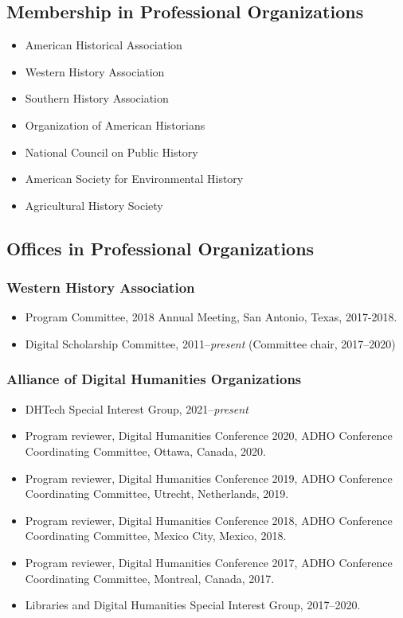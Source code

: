 \documentclass[10pt]{article}
\begin{document}
\subsection*{Membership in Professional Organizations}

\begin{itemize}
  \item American Historical Association
  \item Western History Association
  \item Southern History Association
  \item Organization of American Historians
  \item National Council on Public History
  \item American Society for Environmental History
  \item Agricultural History Society
\end{itemize}

\subsection*{Offices in Professional Organizations}

\subsubsection*{Western History Association}

\begin{itemize}
  \item Program Committee, 2018 Annual Meeting, San Antonio, Texas, 2017-2018.
  \item Digital Scholarship Committee, 2011--\textit{present} (Committee chair, 2017--2020)
\end{itemize}

\subsubsection*{Alliance of Digital Humanities Organizations}

\begin{itemize}
  \item DHTech Special Interest Group, 2021--\textit{present}
  \item Program reviewer, Digital Humanities Conference 2020, ADHO Conference Coordinating Committee, Ottawa, Canada, 2020.
  \item Program reviewer, Digital Humanities Conference 2019, ADHO Conference Coordinating Committee, Utrecht, Netherlands, 2019.
  \item Program reviewer, Digital Humanities Conference 2018, ADHO Conference Coordinating Committee, Mexico City, Mexico, 2018.
  \item Program reviewer, Digital Humanities Conference 2017, ADHO Conference Coordinating Committee, Montreal, Canada, 2017.
  \item Libraries and Digital Humanities Special Interest Group, 2017--2020.
\end{itemize}
\end{document}
